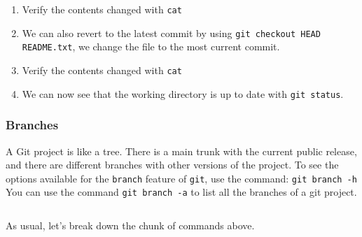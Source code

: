 \documentclass[11pt,fleqn]{article}
\theoremstyle{definition}
\begin{document}
\begin{enumerate}
\item Verify the contents changed with \verb|cat|

\item We can also revert to the latest commit by using \verb|git checkout HEAD README.txt|,
    we change the file to the most current commit.

\item Verify the contents changed with \verb|cat|

\item We can now see that the working directory is up to date with \verb|git status|.
\end{enumerate}

\subsubsection{Branches}
A Git project is like a tree. There is a main trunk with the current public
release, and there are different branches with other versions of the project. To
see the options available for the \verb|branch| feature of \verb|git|, use the
command: \texttt{git branch -h}\\
You can use the command \verb|git branch -a| to list all the branches of a git
project.

\begin{verbatim}
\end{verbatim}

As usual, let's break down the chunk of commands above.
\end{document}
